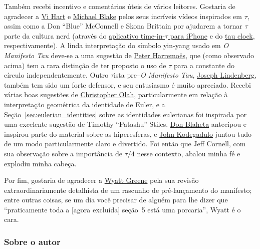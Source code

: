 Também recebi incentivo e comentários úteis de vários leitores. Gostaria de agradecer a \href{https://www.youtube.com/watch?v=jG7vhMMXagQ}{Vi Hart} e \href{https://www.youtube.com/watch?v=3174T-3-59Q}{Michael Blake} pelos seus incríveis vídeos inspirados em $\tau$, assim como a Don ``Blue'' McConnell e Skona Brittain por ajudarem a tornar $\tau$ parte da cultura nerd (através do \href{http://tauclock.com/}{aplicativo time-in-$\tau$ para iPhone} e do \href{http://www.sbcrafts.net/clocks/}{tau clock}, respectivamente). A linda interpretação do símbolo yin-yang usado em \emph{O Manifesto Tau} deve-se a uma sugestão de \href{http://www.harremoes.dk/Peter/}{Peter Harremo\"{e}s}, que (como observado acima) tem a rara distinção de ter proposto o uso de $\tau$ para a constante do círculo independentemente. Outro $\tau$ista pre--\emph{O Manifesto Tau}, \href{https://sites.google.com/site/taubeforeitwascool/}{Joseph Lindenberg}, também tem sido um forte defensor, e seu entusiasmo é muito apreciado. Recebi várias boas sugestões de \href{https://christopherolah.wordpress.com/about-me}{Christopher Olah}, particularmente em relação à interpretação geométrica da identidade de Euler, e a Seção~\ref{sec:eulerian_identities} sobre as identidades eulerianas foi inspirada por uma excelente sugestão de Timothy ``Patashu'' Stiles. \href{http://www.blahedo.org/blog/archives/001083.html}{Don Blaheta} antecipou e inspirou parte do material sobre as hiperesferas, e \href{http://spikedmath.com/forum/viewtopic.php?f=30&t=147\#p1577}{John Kodegadulo} juntou tudo de um modo particularmente claro e divertido. Foi então que Jeff Cornell, com sua observação sobre a importância de $\tau/4$ nesse contexto, abalou minha fé e explodiu minha cabeça.

Por fim, gostaria de agradecer a \href{https://techiferous.com/}{Wyatt Greene} pela sua revisão extraordinariamente detalhista de um rascunho de pré-lançamento do manifesto; entre outras coisas, se um dia você precisar de alguém para lhe dizer que ``praticamente toda a [agora excluída] seção~5 está uma porcaria'', Wyatt é o cara.


    \subsubsection{Sobre o autor} %
    \label{sec:about_the_author}


